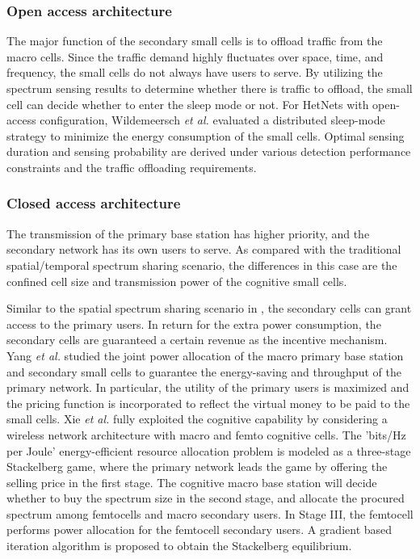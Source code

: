 \documentclass[journal,12pt,onecolumn]{IEEEtran}
\begin{document}
\subsubsection{Open access architecture}
The major function of the secondary small cells is to offload traffic from the macro cells. Since the traffic demand highly fluctuates over space, time, and frequency, the small cells do not always have users to serve. By utilizing the spectrum sensing results to determine whether there is traffic to offload, the small cell can decide whether to enter the sleep mode or not. For HetNets with open-access configuration, Wildemeersch \emph{et al.} \cite{cognetEE} evaluated a distributed sleep-mode strategy to minimize the energy consumption of the small cells. Optimal sensing duration and sensing probability are derived under various detection performance constraints and the traffic offloading requirements.

\subsubsection{Closed access architecture}
The transmission of the primary base station has higher priority, and the secondary network has its own users to serve. As compared with the traditional spatial/temporal spectrum sharing scenario, the differences in this case are the confined cell size and transmission power of the cognitive small cells.

Similar to the spatial spectrum sharing scenario in \cite{taoHan}, the secondary cells can grant access to the primary users. In return for the extra power consumption, the secondary cells are guaranteed a certain revenue as the incentive mechanism. Yang \emph{et al.} \cite{6356121} studied the joint power allocation of the macro primary base station and secondary small cells to guarantee the energy-saving and throughput of the primary network. In particular, the utility of the primary users is maximized and the pricing function is incorporated to reflect the virtual money to be paid to the small cells. Xie \emph{et al.} \cite {auctionSmallcell} fully exploited the cognitive capability by considering a wireless network architecture with macro and femto cognitive cells. The 'bits/Hz per Joule' energy-efficient resource allocation problem is modeled as a three-stage Stackelberg game, where the primary network leads the game by offering the selling price in the first stage. The cognitive macro base station will decide whether to buy the spectrum size in the second stage, and allocate the procured spectrum among femtocells and macro secondary users. In Stage III, the femtocell performs power allocation for the femtocell secondary users. A gradient based iteration algorithm is proposed to obtain the Stackelberg equilibrium.
\end{document}
